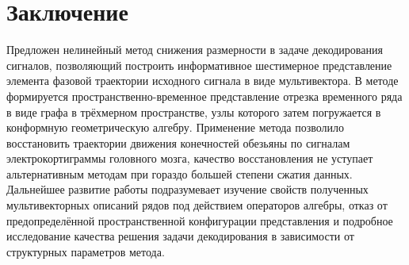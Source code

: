 \documentclass[12pt]{article}
\begin{document}
\begin{comment}
\newpage

\begin{figure}[h]
    \captionsetup{labelformat=empty}
    \centering
    \texttt{[image: fig/правое\_плечо\_10.eps]}
\end{figure}

\begin{figure}[h]
    \centering
    \texttt{[image: fig/правое\_плечо\_25.eps]}
    \caption{Cверху: $h = 10$. Снизу: $h = 25$}
\end{figure}




\newpage


\begin{figure}[h]
    \captionsetup{labelformat=empty}
    \centering
    \texttt{[image: fig/правый\_локоть\_10.eps]}
\end{figure}

\begin{figure}[h]
    \centering
    \texttt{[image: fig/правый\_локоть\_25.eps]}
    \caption{Cверху: $h = 10$. Снизу: $h = 25$}
\end{figure}


\newpage

\begin{figure}[h]
    \captionsetup{labelformat=empty}
    \centering
    \texttt{[image: fig/правое запястье\_10.eps]}
\end{figure}

\begin{figure}[h]
    \centering
    \texttt{[image: fig/правое запястье\_25.eps]}
    \caption{Cверху: $h = 10$. Снизу: $h = 25$}
\end{figure}
\end{comment}

\newpage
\section*{Заключение}

Предложен нелинейный метод снижения размерности в задаче декодирования сигналов, позволяющий построить информативное шестимерное представление элемента фазовой траектории исходного сигнала в виде мультивектора. В методе формируется пространственно-временное представление отрезка временного ряда в виде графа в трёхмерном пространстве, узлы которого затем погружается в конформную геометрическую алгебру. Применение метода позволило восстановить траектории движения конечностей обезьяны по сигналам электрокортиграммы головного мозга, качество восстановления не уступает альтернативным методам при гораздо большей степени сжатия данных. Дальнейшее развитие работы подразумевает изучение свойств полученных мультивекторных описаний рядов под действием операторов алгебры, отказ от предопределённой пространственной конфигурации представления и подробное исследование качества решения задачи декодирования в зависимости от структурных параметров метода.


\newpage
{}


\end{document}

